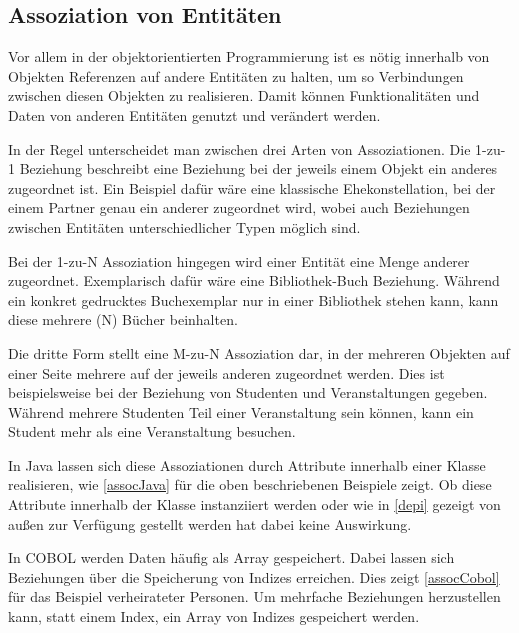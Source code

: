 \subsection{Assoziation von Entitäten}

Vor allem in der objektorientierten Programmierung ist es nötig innerhalb von Objekten Referenzen auf andere Entitäten zu halten, um so Verbindungen zwischen diesen Objekten zu realisieren. Damit können Funktionalitäten und Daten von anderen Entitäten genutzt und verändert werden. 

In der Regel unterscheidet man zwischen drei Arten von Assoziationen. Die 1-zu-1 Beziehung beschreibt eine Beziehung bei der jeweils einem Objekt ein anderes zugeordnet ist. Ein Beispiel dafür wäre eine klassische Ehekonstellation, bei der einem Partner genau ein anderer zugeordnet wird, wobei auch Beziehungen zwischen Entitäten unterschiedlicher Typen möglich sind. 

Bei der 1-zu-N Assoziation hingegen wird einer Entität eine Menge anderer zugeordnet. Exemplarisch dafür wäre eine Bibliothek-Buch Beziehung. Während ein konkret gedrucktes Buchexemplar nur in einer Bibliothek stehen kann, kann diese mehrere (N) Bücher beinhalten. 

Die dritte Form stellt eine M-zu-N Assoziation dar, in der mehreren Objekten auf einer Seite mehrere auf der jeweils anderen zugeordnet werden. Dies ist beispielsweise bei der Beziehung von Studenten und Veranstaltungen gegeben. Während mehrere Studenten Teil einer Veranstaltung sein können, kann ein Student mehr als eine Veranstaltung besuchen.


In Java lassen sich diese Assoziationen durch Attribute innerhalb einer Klasse realisieren, wie \autoref{assocJava} für die oben beschriebenen Beispiele zeigt. Ob diese Attribute innerhalb der Klasse instanziiert werden oder wie in \autoref{depi} gezeigt von außen zur Verfügung gestellt werden hat dabei keine Auswirkung.


In COBOL werden Daten häufig als Array gespeichert. Dabei lassen sich Beziehungen über die Speicherung von Indizes erreichen. Dies zeigt \autoref{assocCobol} für das Beispiel verheirateter Personen. Um mehrfache Beziehungen herzustellen kann, statt einem Index, ein Array von Indizes gespeichert werden.